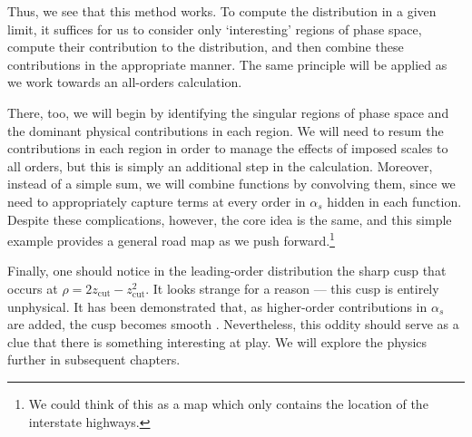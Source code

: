 \documentclass[../thesis.tex]{subfiles}
\providecommand{\zcut}{z_\mathrm{{cut}}}
\begin{document}
	Thus, we see that this method works. To compute the distribution in a given limit, it suffices for us to consider only `interesting' regions of phase space, compute their contribution to the distribution, and then combine these contributions in the appropriate manner. The same principle will be applied as we work towards an all-orders calculation. 

	There, too, we will begin by identifying the singular regions of phase space and the dominant physical contributions in each region. We will need to resum the contributions in each region in order to manage the effects of imposed scales to all orders, but this is simply an additional step in the calculation. Moreover, instead of a simple sum, we will combine functions by convolving them, since we need to appropriately capture terms at every order in $\alpha_s$ hidden in each function. Despite these complications, however, the core idea is the same, and this simple example provides a general road map as we push forward.\footnote{We could think of this as a map which only contains the location of the interstate highways.}

	Finally, one should notice in the leading-order distribution the sharp cusp that occurs at $\rho = 2\zcut - \zcut^2$. It looks strange for a reason --- this cusp is entirely unphysical. It has been demonstrated that, as higher-order contributions in $\alpha_s$ are added, the cusp becomes smooth \cite{larkoski_improving_2020}. Nevertheless, this oddity should serve as a clue that there is something interesting at play. We will explore the physics further in subsequent chapters.


%  
% 
\end{document}
